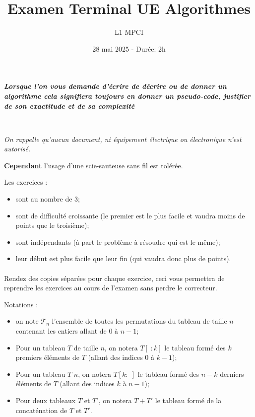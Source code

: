 \documentclass{article}
\title{Examen Terminal UE Algorithmes}
\author{L1 MPCI}
\date{28 mai 2025 - Durée: 2h}
\theoremstyle{exostyle}
\theoremstyle{partiestyle}
\theoremstyle{questionstyle}
\begin{document}
\maketitle

\begin{center}
{\em\bf Lorsque l'on vous demande d'écrire de décrire ou de donner un algorithme cela signifiera toujours en donner un pseudo-code, justifier de son exactitude et de sa complexité}

~\\

{\em On rappelle qu'aucun document, ni équipement électrique ou électronique n'est autorisé.

 {\bf Cependant} l'usage d'une scie-sauteuse sans fil est tolérée.}
\end{center}


\vspace*{1cm}
Les exercices :
\begin{itemize}
\item sont au nombre de 3;
\item sont de difficulté croissante (le premier est le plus facile et vaudra moins de points que le troisième);
\item sont indépendants (à part le problème à résoudre qui est le même);
\item leur début est plus facile que leur fin (qui vaudra donc plus de points).
\end{itemize}

\paragraph{}{\sc Rendez des copies séparées pour chaque exercice, ceci vous permettra de reprendre les exercices au cours de l'examen sans perdre le correcteur.}

\vspace*{1cm}
Notations :
\begin{itemize}
\item on note $\mathcal{T}_n$ l'ensemble de toutes les permutations du tableau de taille $n$ contenant les entiers allant de $0$ à $n-1$;
\item Pour un tableau $T$ de taille $n$, on notera $T[\;:k]$ le tableau formé des  $k$ premiers éléments de $T$ (allant des indices 0 à $k-1$);
\item Pour un tableau $T$ $n$, on notera $T[k:\;]$ le tableau formé des $n-k$ derniers éléments de $T$ (allant des indices $k$ à $n-1$);
\item Pour deux tableaux $T$ et $T'$, on notera $T + T'$ le tableau formé de la concaténation de $T$ et $T'$.
\end{itemize}
\end{document}
